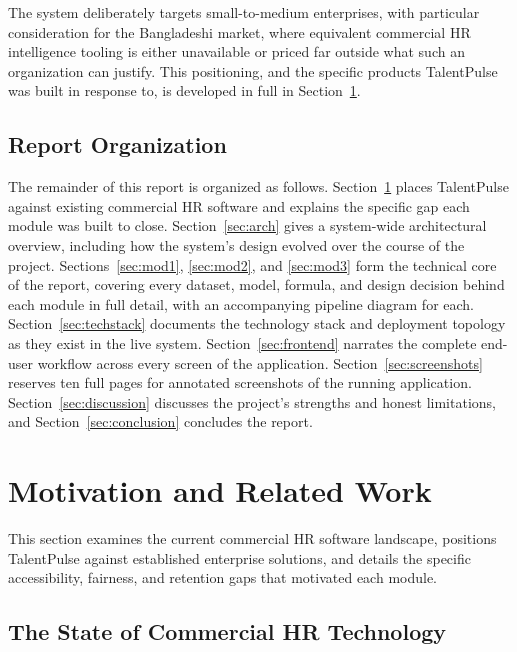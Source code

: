 \documentclass[11pt,a4paper]{article}
\begin{document}
The system deliberately targets small-to-medium enterprises, with particular consideration for the Bangladeshi market, where equivalent commercial HR intelligence tooling is either unavailable or priced far outside what such an organization can justify. This positioning, and the specific products TalentPulse was built in response to, is developed in full in Section~\ref{sec:motivation}.

\subsection{Report Organization}

The remainder of this report is organized as follows. Section~\ref{sec:motivation} places TalentPulse against existing commercial HR software and explains the specific gap each module was built to close. Section~\ref{sec:arch} gives a system-wide architectural overview, including how the system's design evolved over the course of the project. Sections~\ref{sec:mod1}, \ref{sec:mod2}, and \ref{sec:mod3} form the technical core of the report, covering every dataset, model, formula, and design decision behind each module in full detail, with an accompanying pipeline diagram for each. Section~\ref{sec:techstack} documents the technology stack and deployment topology as they exist in the live system. Section~\ref{sec:frontend} narrates the complete end-user workflow across every screen of the application. Section~\ref{sec:screenshots} reserves ten full pages for annotated screenshots of the running application. Section~\ref{sec:discussion} discusses the project's strengths and honest limitations, and Section~\ref{sec:conclusion} concludes the report.

\clearpage
\section{Motivation and Related Work}
\label{sec:motivation}

This section examines the current commercial HR software landscape, positions TalentPulse against established enterprise solutions, and details the specific accessibility, fairness, and retention gaps that motivated each module.

\subsection{The State of Commercial HR Technology}
\end{document}
